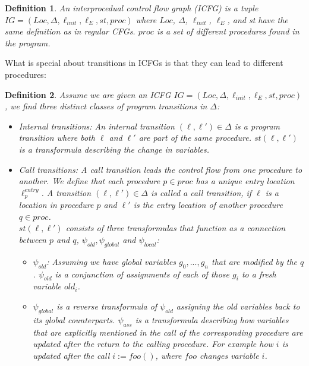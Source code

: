 \documentclass{article}
\newtheorem{mydef}{Definition}
\begin{document}
	\begin{mydef}
		An interprocedual control flow graph (ICFG) is a tuple \\$IG = (Loc, \Delta, \ell_{init}, \ell_E, st, proc)$ where $Loc$, $\Delta$, $\ell_{init}$, $\ell_E$, and st have the same definition as in regular CFGs. $proc$ is a set of different procedures found in the program. 
	\end{mydef}
	What is special about transitions in ICFGs is that they can lead to different procedures:
	\begin{mydef} Assume we are given an ICFG $IG = (Loc, \Delta, \ell_{init}, \ell_E, st, proc)$, we find three distinct classes of program transitions in $\Delta$:
		\begin{itemize}
			\item Internal transitions: An internal transition $(\ell, \ell') \in \Delta$ is a program transition where both $\ell$ and $\ell'$ are part of the same procedure. $st(\ell, \ell')$ is a transformula describing the change in variables.
			
			\item Call transitions:  A call transition leads the control flow from one procedure to another. We define that each procedure $p \in proc$ has a unique entry location $\ell^{entry}_p$. A transition $(\ell, \ell') \in \Delta$ is called a call transition, if $\ell$ is a location in procedure $p$ and $\ell'$ is the entry location of another procedure $q \in proc$. \\ $st(\ell, \ell')$ consists of three transformulas that function as a connection between $p$ and $q$, $\psi_{old}, \psi_{global}$ and $\psi_{local}$: 
			\begin{itemize}
				\item$\psi_{old}$: Assuming we have global variables $g_0, ..., g_n$ that are modified by the $q$. $\psi_{old}$ is a conjunction of assignments of each of those $g_i$ to a fresh variable $old_{i}$. 
				\item $\psi_{global}$ is a reverse transformula of $\psi_{old}$ assigning the old variables back to its global counterparts.
 $\psi_{ass}$ is a transformula describing how variables that are explicitly mentioned in the call of the corresponding procedure are updated after the return to the calling procedure. For example how $i$ is updated after the call $i := foo()$, where $foo$ changes variable $i$.
			\end{itemize}
			

\end{itemize}
\end{mydef}
\end{document}
